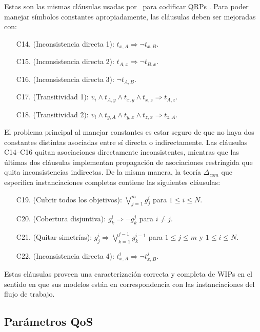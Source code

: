 Estas son las mismas cláusulas usadas por \mcdsat\ para codificar QRPs \cite{arvelo:aaai06}.
Para poder manejar símbolos constantes apropiadamente, las cláusulas deben ser
mejoradas con:

\begin{enumerate}[C10.]
\item[C14.] (Inconsistencia directa 1): $t_{x,A} \Rightarrow \neg t_{x,B}$.
\item[C15.] (Inconsistencia directa 2): $t_{A,x} \Rightarrow \neg t_{B,x}$.
\item[C16.] (Inconsistencia directa 3): $\neg t_{A,B}$.
\item[C17.] (Transitividad 1): $v_i\land t_{A,y}\land t_{x,y}\land t_{x,z}\Rightarrow t_{A,z}$.
\item[C18.] (Transitividad 2): $v_i\land t_{y,A}\land t_{y,x}\land t_{z,x}\Rightarrow t_{z,A}$.
\end{enumerate}

El problema principal al manejar constantes es estar seguro de que no haya dos
constantes distintas asociadas entre sí directa o indirectamente. Las cláusulas
C14--C16 quitan asociaciones directamente inconsistentes, mientras que las
últimas dos cláusulas implementan propagación de asociaciones restringida que
quita inconsistencias indirectas.
De la misma manera, la teoría $\Delta_{com}$ que especifica instanciaciones
completas contiene las siguientes cláusulas:

\begin{enumerate}[C10.]
\item[C19.] (Cubrir todos los objetivos): $\bigvee_{j=1}^m g^i_j$ para $1\leq i\leq N$.
\item[C20.] (Cobertura disjuntiva): $g^i_k \Rightarrow \neg g^j_k$ para $i\neq j$.
\item[C21.] (Quitar simetrías): $g^i_j \Rightarrow \bigvee_{k=1}^{j-1} g^{i-1}_k$
            para $1\leq j\leq m$ y $1\leq i\leq N$.
\item[C22.] (Inconsistencia directa 4): $t^i_{x,A} \Rightarrow \neg t^j_{x,B}$.
\end{enumerate}

Estas cláusulas proveen una caracterización correcta y completa de WIPs en el
sentido en que sus modelos están en correspondencia con las instanciaciones del
flujo de trabajo.

\subsection{Parámetros QoS}

